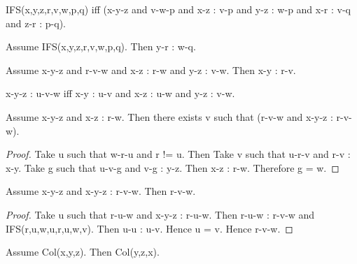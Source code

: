 \documentclass{article}
\begin{document}
\begin{forthel}
    \begin{definition}[IFS]
      IFS(x,y,z,r,v,w,p,q) iff (x-y-z and v-w-p and x-z : v-p and y-z : w-p and
      x-r : v-q and z-r : p-q).
    \end{definition}

    \begin{axiom}[L4_2]
      Assume IFS(x,y,z,r,v,w,p,q). Then y-r : w-q.
    \end{axiom}

    \begin{axiom}[L4_3]
      Assume x-y-z and r-v-w and x-z : r-w and y-z : v-w. Then x-y : r-v.
    \end{axiom}

    \begin{definition}[L4_4]
      x-y-z : u-v-w iff x-y : u-v and x-z : u-w and y-z : v-w.
    \end{definition}

    \begin{lemma}[L4_5]
      Assume x-y-z and x-z : r-w. Then there exists v such that (r-v-w and
      x-y-z : r-v-w).
    \end{lemma}
    \begin{proof}
    	Take u such that w-r-u and r != u. Then Take v such that u-r-v and
      r-v : x-y. Take g such that u-v-g and v-g : y-z. Then x-z : r-w. Therefore
      g = w.
    \end{proof}

    \begin{lemma}[L4_6]
      Assume x-y-z and x-y-z : r-v-w. Then r-v-w.
    \end{lemma}
    \begin{proof}
    	Take u such that r-u-w and x-y-z : r-u-w.
    	Then r-u-w : r-v-w and IFS(r,u,w,u,r,u,w,v).
    	Then u-u : u-v. Hence u = v. Hence r-v-w.
    \end{proof}

    \begin{lemma}[L4_11a]
      Assume Col(x,y,z). Then Col(y,z,x).
    \end{lemma}


\end{forthel}
\end{document}
